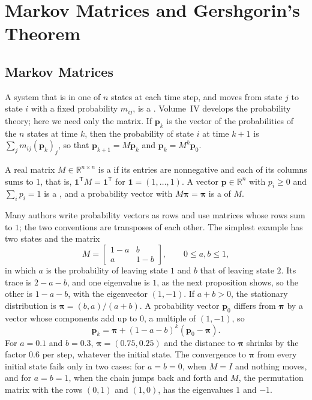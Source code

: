 \section{Markov Matrices and Gershgorin's Theorem}
\label{sec:markov}

\subsection{Markov Matrices}

A system that is in one of $n$ states at each time step, and moves from state $j$ to state $i$ with a fixed probability $m_{ij}$, is a . Volume~IV develops the probability theory; here we need only the matrix. If $\mathbf p_k$ is the vector of the probabilities of the $n$ states at time $k$, then the probability of state $i$ at time $k+1$ is $\sum_jm_{ij}(\mathbf p_k)_j$, so that $\mathbf p_{k+1}=M\mathbf p_k$ and $\mathbf p_k=M^k\mathbf p_0$.

\begin{definition}
\label{def:markov}
A real matrix $M\in\mathbb R^{n\times n}$ is a  if its entries are nonnegative and each of its columns sums to $1$, that is, $\mathbf 1^{\mathsf T}M=\mathbf 1^{\mathsf T}$ for $\mathbf 1=(1,\ldots,1)$. A vector $\mathbf p\in\mathbb R^n$ with $p_i\ge0$ and $\sum_ip_i=1$ is a , and a probability vector with $M\boldsymbol\pi=\boldsymbol\pi$ is a  of $M$.
\end{definition}

Many authors write probability vectors as rows and use matrices whose rows sum to $1$; the two conventions are transposes of each other. The simplest example has two states and the matrix
\[
M=\begin{bmatrix}1-a&b\\a&1-b\end{bmatrix},\qquad0\le a,b\le1 ,
\]
in which $a$ is the probability of leaving state $1$ and $b$ that of leaving state $2$. Its trace is $2-a-b$, and one eigenvalue is $1$, as the next proposition shows, so the other is $1-a-b$, with the eigenvector $(1,-1)$. If $a+b>0$, the stationary distribution is $\boldsymbol\pi=(b,a)/(a+b)$. A probability vector $\mathbf p_0$ differs from $\boldsymbol\pi$ by a vector whose components add up to $0$, a multiple of $(1,-1)$, so
\[
\mathbf p_k=\boldsymbol\pi+(1-a-b)^k(\mathbf p_0-\boldsymbol\pi).
\]
For $a=0.1$ and $b=0.3$, $\boldsymbol\pi=(0.75,0.25)$ and the distance to $\boldsymbol\pi$ shrinks by the factor $0.6$ per step, whatever the initial state. The convergence to $\boldsymbol\pi$ from every initial state fails only in two cases: for $a=b=0$, when $M=I$ and nothing moves, and for $a=b=1$, when the chain jumps back and forth and $M$, the permutation matrix with the rows $(0,1)$ and $(1,0)$, has the eigenvalues $1$ and $-1$.

